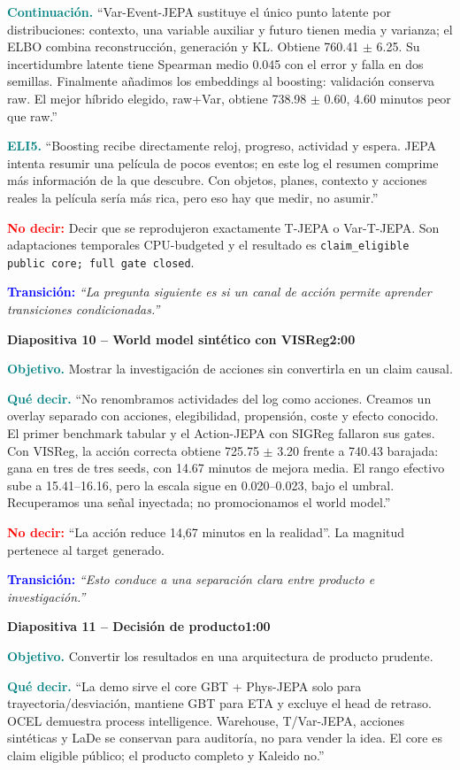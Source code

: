 \documentclass[11pt,a4paper]{article}
\newcommand{\claim}{\texttt{claim\_eligible public core; full gate closed}}
\newcommand{\slidehead}[3]{%
  \par\vspace{7pt}\noindent
  \colorbox{Ink}{\parbox{\dimexpr\linewidth-2\fboxsep\relax}{%
    \color{white}\textbf{Diapositiva #1 -- #2}\hfill\color{Teal!45}\textbf{#3}}}%
  \par\vspace{5pt}}
\newcommand{\cue}[1]{\textcolor{Teal}{\textbf{#1}}}
\newcommand{\avoid}[1]{\textcolor{Red}{\textbf{No decir:}} #1}
\newcommand{\transition}[1]{\textcolor{Blue}{\textbf{Transición:}} \emph{``#1''}}
\begin{document}
\cue{Continuación.} ``Var-Event-JEPA sustituye el único punto latente por distribuciones:
contexto, una variable auxiliar y futuro tienen media y varianza; el ELBO combina
reconstrucción, generación y KL. Obtiene 760.41 $\pm$ 6.25. Su
incertidumbre latente tiene Spearman medio 0.045 con el error y falla en dos
semillas. Finalmente añadimos los embeddings al boosting: validación conserva raw. El mejor
híbrido elegido, raw+Var, obtiene 738.98 $\pm$ 0.60, 4.60
minutos peor que raw.''

\cue{ELI5.} ``Boosting recibe directamente reloj, progreso, actividad y espera. JEPA intenta
resumir una película de pocos eventos; en este log el resumen comprime más información de la
que descubre. Con objetos, planes, contexto y acciones reales la película sería más rica,
pero eso hay que medir, no asumir.''

\avoid{Decir que se reprodujeron exactamente T-JEPA o Var-T-JEPA. Son adaptaciones temporales
CPU-budgeted y el resultado es \claim.}

\transition{La pregunta siguiente es si un canal de acción permite aprender transiciones condicionadas.}

\clearpage
\slidehead{10}{World model sintético con VISReg}{2:00}
\cue{Objetivo.} Mostrar la investigación de acciones sin convertirla en un claim causal.

\cue{Qué decir.} ``No renombramos actividades del log como acciones. Creamos un overlay
separado con acciones, elegibilidad, propensión, coste y efecto conocido. El primer
benchmark tabular y el Action-JEPA con SIGReg fallaron sus gates. Con VISReg, la acción
correcta obtiene 725.75 $\pm$ 3.20 frente a
740.43 barajada: gana en tres de tres seeds, con 14.67 minutos de
mejora media. El rango efectivo sube a 15.41--16.16, pero la
escala sigue en 0.020--0.023, bajo el umbral. Recuperamos una
señal inyectada; no promocionamos el world model.''

\avoid{``La acción reduce 14,67 minutos en la realidad''. La magnitud pertenece al target generado.}

\transition{Esto conduce a una separación clara entre producto e investigación.}

\fi
\slidehead{11}{Decisión de producto}{1:00}
\cue{Objetivo.} Convertir los resultados en una arquitectura de producto prudente.

\cue{Qué decir.} ``La demo sirve el core GBT + Phys-JEPA solo para trayectoria/desviación,
mantiene GBT para ETA y excluye el head de retraso. OCEL demuestra process intelligence.
Warehouse, T/Var-JEPA, acciones sintéticas y LaDe se conservan para auditoría, no para vender
la idea. El core es claim eligible público; el producto completo y Kaleido no.''
\end{document}
